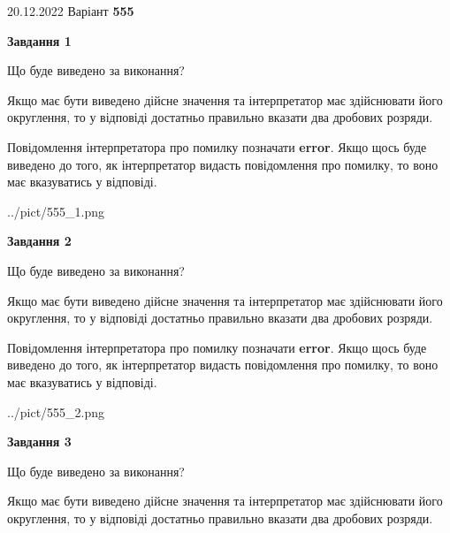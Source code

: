 \documentclass[12pt, ukrainian]{article}
\begin{document}
{20.12.2022 Варіант \No \textbf { 555 }\par}
{
\begin {Large}

{\begin {center}\textbf{Завдання 1}\end {center}}\par
Що буде виведено за виконання? \par

Якщо має бути виведено дійсне значення та інтерпретатор має здійснювати його округлення, 
то у відповіді достатньо правильно вказати два дробових розряди.

Повідомлення інтерпретатора про помилку позначати \textbf{error}.
Якщо щось буде виведено до того, як інтерпретатор видасть повідомлення про помилку, 
то воно має вказуватись у відповіді. \par

\begin{center}
	{../pict/555_1.png}
\end{center}
\newpage

{\begin {center}\textbf{Завдання 2}\end {center}}\par
Що буде виведено за виконання? \par

Якщо має бути виведено дійсне значення та інтерпретатор має здійснювати його округлення, 
то у відповіді достатньо правильно вказати два дробових розряди.

Повідомлення інтерпретатора про помилку позначати \textbf{error}.
Якщо щось буде виведено до того, як інтерпретатор видасть повідомлення про помилку, 
то воно має вказуватись у відповіді. \par

\begin{center}
	{../pict/555_2.png}
\end{center}
\newpage

{\begin {center}\textbf{Завдання 3}\end {center}}\par
Що буде виведено за виконання? \par

Якщо має бути виведено дійсне значення та інтерпретатор має здійснювати його округлення, 
то у відповіді достатньо правильно вказати два дробових розряди.


\end{Large}}
\end{document}
